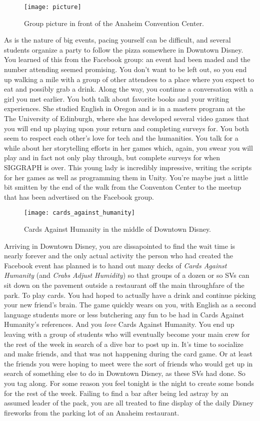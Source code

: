 \documentclass[../main.tex]{subfiles}
\begin{document}
\begin{figure}[h]
	\centering
	\texttt{[image: picture]}
	\caption*{Group picture in front of the Anaheim Convention Center.}
\end{figure}

As is the nature of big events, pacing yourself can be difficult, and several students organize a party to follow the pizza somewhere in Downtown Disney. You learned of this from the Facebook group: an event had been maded and the number attending seemed promising. You don't want to be left out, so you end up walking a mile with a group of other attendees to a place where you expect to eat and possibly grab a drink. Along the way, you continue a conversation with a girl you met earlier. You both talk about favorite books and your writing experiences. She studied English in Oregon and is in a masters program at the The University of Edinburgh, where she has developed several video games that you will end up playing upon your return and completing surveys for. You both seem to respect each other's love for tech and the humanities. You talk for a while about her storytelling efforts in her games which, again, you swear you will play and in fact not only play through, but complete surveys for when SIGGRAPH is over. This young lady is incredibly impressive, writing the scripts for her games as well as programming them in Unity. You're maybe just a little bit smitten by the end of the walk from the Conventon Center to the meetup that has been advertised on the Facebook group.

\begin{figure}[h]
	\centering
	\texttt{[image: cards\_against\_humanity]}
	\caption*{Cards Against Humanity in the middle of Downtown Disney.}
\end{figure}

Arriving in Downtown Disney, you are dissapointed to find the wait time is nearly forever and the only actual activity the person who had created the Facebook event has planned is to hand out many decks of \textit{Cards Against Humanity} (and \textit{Crabs Adjust Humidity}) so that groups of a dozen or so SVs can sit down on the pavement outside a restaurant off the main throughfare of the park. To play cards. You had hoped to actually have a drink and continue picking your new friend's brain. The game quickly wears on you, with English as a second language students more or less butchering any fun to be had in Cards Against Humanity's references. And you \textit{love} Cards Against Humanity. You end up leaving with a group of students who will eventually become your main crew for the rest of the week in search of a dive bar to post up in. It's time to socialize and make friends, and that was not happening during the card game. Or at least the friends you were hoping to meet were the sort of friends who would get up in search of something else to do in Downtown Disney, as these SVs had done. So you tag along. For some reason you feel tonight is the night to create some bonds for the rest of the week. Failing to find a bar after being led astray by an assumed leader of the pack, you are all treated to fine display of the daily Disney fireworks from the parking lot of an Anaheim restaurant.
\end{document}
